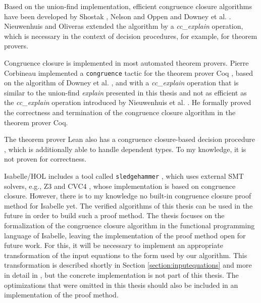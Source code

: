Based on the union-find implementation, efficient congruence closure algorithms have been developed by Shostak \cite{congruenceclosure-og2}, Nelson and Oppen \cite{congruenceclosure-og} and Downey et al. \cite{congruenceclosure-og3}.
Nieuwenhuis and Oliveras \cite{Nieuwenhuis} extended the algorithm by a \emph{cc\_explain} operation, which is necessary in the context of decision procedures, for example, for theorem provers.

Congruence closure is implemented in most automated theorem provers. Pierre Corbineau implemented a \lstinline|congruence| tactic for the theorem prover Coq \cite{congruenceclosure-coq, congruence-coq}, based on the algorithm of Downey et al. \cite{congruenceclosure-og3}, and with a \emph{cc\_explain} operation that is similar to the union-find \emph{explain} presented in this thesis and not as efficient as the \emph{cc\_explain} operation introduced by Nieuwenhuis et al. \cite{Nieuwenhuis}. He formally proved the correctness and termination of the congruence closure algorithm in the theorem prover Coq.

The theorem prover Lean also has a congruence closure-based decision procedure \cite{congruenceclosure-lean}, which is additionally able to handle dependent types. To my knowledge, it is not proven for correctness.

Isabelle/HOL includes a tool called \lstinline|sledgehammer| \cite{sledgehammer}, which uses external SMT solvers, e.g., Z3 \cite{z3} and CVC4 \cite{cvc4}, whose implementation is based on congruence closure.
However, there is to my knowledge no built-in congruence closure proof method for Isabelle yet.
The verified algorithms of this thesis can be used in the future in order to build such a proof method.
The thesis focuses on the formalization of the congruence closure algorithm in the functional programming language of Isabelle, leaving the implementation of the proof method open for future work.
For this, it will be necessary to implement an appropriate transformation of the input equations to the form used by our algorithm.
This transformation is described shortly in Section \ref{section:inputequations} and more in detail in \cite{Nieuwenhuis}, but the concrete implementation is not part of this thesis.
The optimizations that were omitted in this thesis should also be included in an implementation of the proof method.
